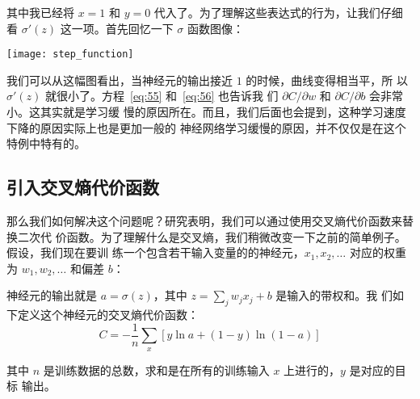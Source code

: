 其中我已经将 $x = 1$ 和 $y = 0$ 代入了。为了理解这些表达式的行为，让我们仔细
看 $\sigma'(z)$ 这一项。首先回忆一下 $\sigma$ 函数图像：
\begin{center}
  \texttt{[image: step\_function]}
\end{center}

我们可以从这幅图看出，当神经元的输出接近 $1$ 的时候，曲线变得相当平，所
以 $\sigma'(z)$ 就很小了。方程~\eqref{eq:55} 和~\eqref{eq:56} 也告诉我
们 $\partial C/\partial w$ 和 $\partial C/\partial b$ 会非常小。这其实就是学习缓
慢的原因所在。而且，我们后面也会提到，这种学习速度下降的原因实际上也是更加一般的
神经网络学习缓慢的原因，并不仅仅是在这个特例中特有的。

\subsection{引入交叉熵代价函数}
\label{sec:introducing_the_cross-entropy_cost_function}

那么我们如何解决这个问题呢？研究表明，我们可以通过使用交叉熵代价函数来替换二次代
价函数。为了理解什么是交叉熵，我们稍微改变一下之前的简单例子。假设，我们现在要训
练一个包含若干输入变量的的神经元，$x_1, x_2, \ldots$ 对应的权重为 $w_1, w_2,
\ldots$ 和偏差 $b$：

\begin{center}
\end{center}

神经元的输出就是 $a = \sigma(z)$，其中 $z = \sum_j w_j x_j+b$ 是输入的带权和。我
们如下定义这个神经元的交叉熵代价函数：
\begin{equation} 
  C = -\frac{1}{n} \sum_x \left[y \ln a + (1-y ) \ln (1-a) \right]
\label{eq:57}\tag{57}
\end{equation}

其中 $n$ 是训练数据的总数，求和是在所有的训练输入 $x$ 上进行的，$y$ 是对应的目标
输出。


